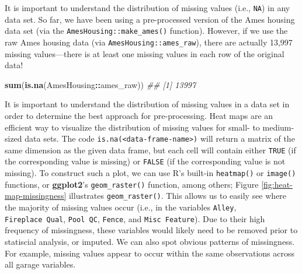 \documentclass[]{krantz}
\makeatletter
\newenvironment{Shaded}{\begin{snugshade}}{\end{snugshade}}
\newcommand{\CommentTok}[1]{\textcolor[rgb]{0.37,0.37,0.37}{\textit{#1}}}
\newcommand{\KeywordTok}[1]{\textcolor[rgb]{0.27,0.27,0.27}{\textbf{#1}}}
\newcommand{\NormalTok}[1]{#1}
\newcommand{\OperatorTok}[1]{\textcolor[rgb]{0.43,0.43,0.43}{\textbf{#1}}}
\newenvironment{kframe}{%
\medskip{}
\setlength{\fboxsep}{.8em}
 \def\at@end@of@kframe{}%
 \ifinner\ifhmode%
  \def\at@end@of@kframe{\end{minipage}}%
  \begin{minipage}{\columnwidth}%
 \fi\fi%
 \def\FrameCommand##1{\hskip\@totalleftmargin \hskip-\fboxsep
 \colorbox{shadecolor}{##1}\hskip-\fboxsep
     \hskip-\linewidth \hskip-\@totalleftmargin \hskip\columnwidth}%
 \MakeFramed {\advance\hsize-\width
   \@totalleftmargin\z@ \linewidth\hsize
   \@setminipage}}%
 {\par\unskip\endMakeFramed%
 \at@end@of@kframe}
\renewenvironment{Shaded}{\begin{kframe}}{\end{kframe}}
\makeatother
\begin{document}
It is important to understand the distribution of missing values (i.e., \texttt{NA}) in any data set. So far, we have been using a pre-processed version of the Ames housing data set (via the \texttt{AmesHousing::make\_ames()} function). However, if we use the raw Ames housing data (via \texttt{AmesHousing::ames\_raw}), there are actually 13,997 missing values---there is at least one missing values in each row of the original data!

\begin{Shaded}
\begin{Highlighting}[]
\KeywordTok{sum}\NormalTok{(}\KeywordTok{is.na}\NormalTok{(AmesHousing}\OperatorTok{::}\NormalTok{ames_raw))}
\CommentTok{## [1] 13997}
\end{Highlighting}
\end{Shaded}

It is important to understand the distribution of missing values in a data set in order to determine the best approach for pre-processing. Heat maps are an efficient way to visualize the distribution of missing values for small- to medium-sized data sets. The code \texttt{is.na(\textless{}data-frame-name\textgreater{})} will return a matrix of the same dimension as the given data frame, but each cell will contain either \texttt{TRUE} (if the corresponding value is missing) or \texttt{FALSE} (if the corresponding value is not missing). To construct such a plot, we can use R's built-in \texttt{heatmap()} or \texttt{image()} functions, or \textbf{ggplot2}'s \texttt{geom\_raster()} function, among others; Figure \ref{fig:heat-map-missingness} illustrates \texttt{geom\_raster()}. This allows us to easily see where the majority of missing values occur (i.e., in the variables \texttt{Alley}, \texttt{Fireplace\ Qual}, \texttt{Pool\ QC}, \texttt{Fence}, and \texttt{Misc\ Feature}). Due to their high frequency of missingness, these variables would likely need to be removed prior to statiscial analysis, or imputed. We can also spot obvious patterns of missingness. For example, missing values appear to occur within the same observations across all garage variables.
\end{document}
